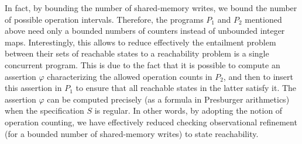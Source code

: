 In fact, by bounding the number of shared-memory writes, we bound the number of possible operation intervals. Therefore, the programs $P_1$ and $P_2$ mentioned above need only a bounded numbers of counters instead of unbounded integer maps. Interestingly, this allows to reduce effectively the entailment problem between their sets of reachable states to a reachability problem is a single concurrent program. This is due to the fact that it is possible to compute an assertion $\varphi$ characterizing the allowed operation counts in $P_2$, and then to insert this assertion in $P_1$ to ensure that all reachable states in the latter satisfy it. The assertion $\varphi$ can be computed precisely (as a formula in Presburger arithmetics) when the specification $S$ is regular.  In other words, by adopting the notion of operation counting, we have effectively reduced checking observational refinement (for a bounded number of shared-memory writes) to state reachability.



